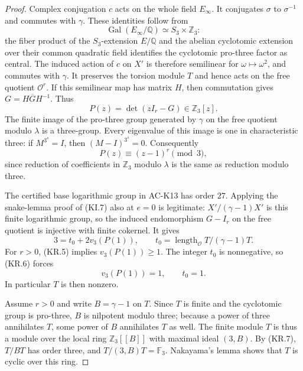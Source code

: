 \begin{proof}
Complex conjugation $c$ acts on the whole field $E_\infty$.
It conjugates $\sigma$ to $\sigma^{-1}$ and commutes with
$\gamma$.  These identities follow from
\[
 \operatorname{Gal}(E_\infty/\mathbb Q)
       \simeq S_3\times\mathbb Z_3:
\]
the fiber product of the $S_3$-extension $E/\mathbb Q$
and the abelian cyclotomic extension over their common quadratic
field identifies the cyclotomic pro-three factor as central.
The induced action of $c$ on $X'$ is therefore semilinear for
$\omega\mapsto\omega^2$, and commutes with $\gamma$.
It preserves the torsion module $T$ and hence acts on the
free quotient $\mathcal O^r$.
If this semilinear map has matrix $H$, then commutation gives
$G=H\overline G H^{-1}$.  Thus
\[
 P(z)=\det(zI_r-G)\in\mathbb Z_3[z].                   \tag{KR.4}
\]
The finite image of the pro-three group generated by $\gamma$
on the free quotient modulo $\lambda$ is a three-group.
Every eigenvalue of this image is one in characteristic three:
if $M^{3^s}=I$, then $(M-I)^{3^s}=0$.
Consequently
\[
                    P(z)\equiv(z-1)^r\pmod3,          \tag{KR.5}
\]
since reduction of coefficients in $\mathbb Z_3$ modulo
$\lambda$ is the same as reduction modulo three.

The certified base logarithmic group in AC-K13 has order
$27$.  Applying the snake-lemma proof of (KI.7) also at
$e=0$ is legitimate: $X'/(\gamma-1)X'$ is this finite
logarithmic group, so the induced endomorphism $G-I_r$
on the free quotient is injective with finite cokernel.
It gives
\[
 3=t_0+2v_3(P(1)),\qquad
 t_0=\operatorname{length}_{\mathcal O}T/(\gamma-1)T.
                                                               \tag{KR.6}
\]
For $r>0$, (KR.5) implies $v_3(P(1))\geq1$.
The integer $t_0$ is nonnegative, so (KR.6) forces
\[
                     v_3(P(1))=1,\qquad t_0=1.        \tag{KR.7}
\]
In particular $T$ is then nonzero.

Assume $r>0$ and write $B=\gamma-1$ on $T$.
Since $T$ is finite and the cyclotomic group is pro-three,
$B$ is nilpotent modulo three; because a power of three
annihilates $T$, some power of $B$ annihilates $T$ as well.
The finite module $T$ is thus a module over the local ring
$\mathbb Z_3[[B]]$ with maximal ideal $(3,B)$.
By (KR.7), $T/BT$ has order three, and
$T/(3,B)T=\mathbb F_3$.  Nakayama's lemma shows that $T$
is cyclic over this ring.


\end{proof}
